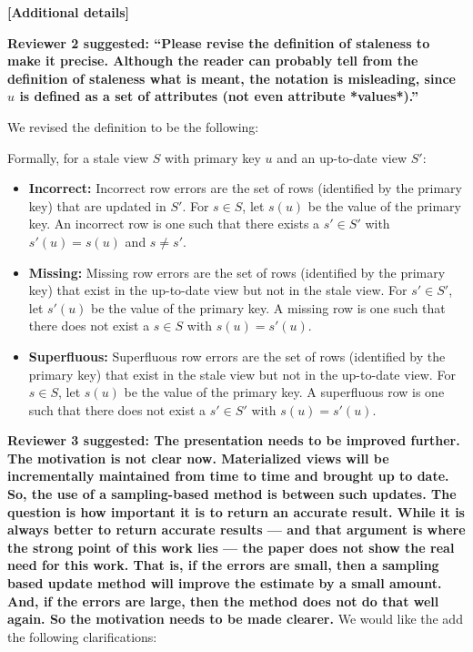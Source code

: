 \vspace{2.0em}

\noindent\textbf{[Additional details]}

\textbf{Reviewer 2 suggested: “Please revise the definition of staleness to make it precise. Although the reader can probably tell from the definition of staleness what is meant, the notation is misleading, since $u$ is defined as a set of attributes (not even attribute *values*).”}

We revised the definition to be the following:

Formally, for a stale view $S$ with primary key $u$ and an up-to-date view $S'$:
\begin{itemize}[noitemsep] \sloppy
	\item \textbf{Incorrect: } Incorrect row errors are the set of rows (identified by the primary key) that are updated in $S'$. For $s \in S$, let $s(u)$ be the value of the primary key. An incorrect row is one such that there exists a $s' \in S'$ with $s'(u) = s(u)$ and $s \ne s'$.
	\item \textbf{Missing: } Missing row errors are the set of rows (identified by the primary key) that exist in the up-to-date view but not in the stale view. For $s' \in S'$, let $s'(u)$ be the value of the primary key. A missing row is one such that there does not exist a $s \in S$ with $s(u) = s'(u)$.
	\item \textbf{Superfluous: } Superfluous row errors are the set of rows (identified by the primary key) that exist in the stale view but not in the up-to-date view. For $s \in S$, let $s(u)$ be the value of the primary key. A superfluous row is one such that there does not exist a $s' \in S'$ with $s(u) = s'(u)$.
\end{itemize}

\vspace{1.5em}

\textbf{Reviewer 3 suggested: The presentation needs to be improved further. The motivation is not clear now. Materialized views will be incrementally maintained from time to time and brought up to date. So, the use of a sampling-based method is between such updates. The question is how important it is to return an accurate result. While it is always better to return accurate results --- and that argument is where the strong point of this work lies --- the paper does not show the real need for this work. That is, if the errors are small, then a sampling based update method will improve the estimate by a small amount. And, if the errors are large, then the method does not do that well again. So the motivation needs to be made clearer.}
We would like the add the following clarifications:

